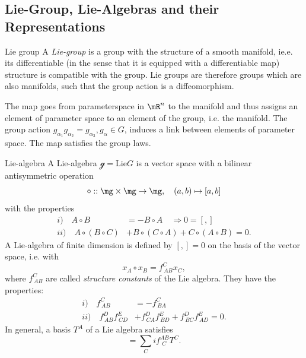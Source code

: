 \subsection{Lie-Group, Lie-Algebras and their Representations}
\begin{mybox}{Lie group} 
	A \emph{Lie-group} is a group with the structure of a smooth manifold, ie.e. its differentiable (in the sense that it is equipped with a differentiable map) structure is compatible with the group. Lie groups are therefore groups which are also manifolds, such that the group action is a diffeomorphism. \\
\end{mybox}
The map goes from parameterspace in $\mR^n$ to the manifold and thus assigns an element of parameter space to an element of the group, i.e. the manifold. The group action $g_{\alpha_1} g_{\alpha_2} =g_{\alpha_3}, g_{\alpha} \in G$, induces a link between elements of parameter space. The map satisfies the group laws.
\begin{mybox}{Lie-algebra}
	A Lie-algebra $\mathcal{g}=$Lie$G$ is a vector space with a bilinear antisymmetric operation
	\begin{equation}
		\circ:: \mg \times \mg \rightarrow \mg, \quad (a,b) \mapsto [a,b]
	\end{equation}
	with the properties
	\begin{align}
		i) \quad A\circ B &= - B\circ A \quad \Rightarrow 0 = [,]\\
		ii)\quad A\circ(B\circ C) &+ B\circ (C\circ A) + C\circ (A\circ B) = 0.
	\end{align}
A Lie-algebra of finite dimension is defined by $[,]=0$ on the basis of the vector space, i.e. with
\begin{equation}
	x_A \circ x_B = f^C_{\, AB} x_C,
\end{equation}
where $f^C_{\,AB}$ are called \emph{structure constants} of the Lie algebra. They have the properties:
\begin{align}
	i) \quad f^C_{\, AB} &= - f^C_{\, BA} \\
	ii) \quad f^D_{\, AB} f^E_{\, CD} &+ f^D_{\, CA} f^E_{\, BD} + f^D_{\, BC} f^E_{\, AD} =0.
\end{align}
In general, a basis $T^A$ of a Lie algebra satisfies
\begin{equation}
	[T^A,T^B]= \sum_C i f^{AB}_{\,\, C} T^C.
\end{equation}
\end{mybox}
